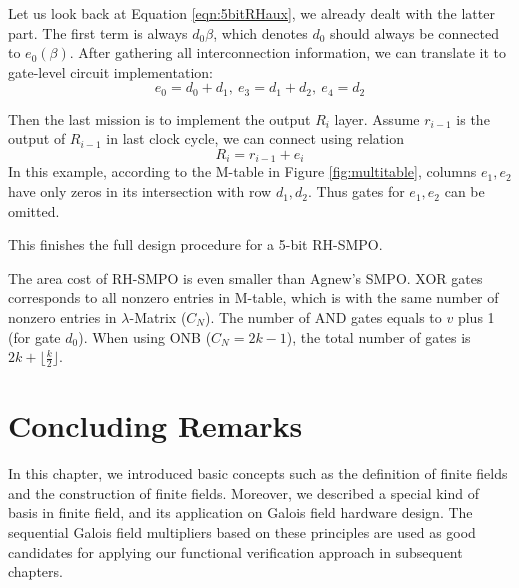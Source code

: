 \begin{Example}
Let us look back at Equation \ref{eqn:5bitRHaux}, we already dealt with the latter part.
The first term is always $d_0\beta$, which denotes $d_0$ should always be connected to $e_0(\beta)$.
After gathering all interconnection information, we can translate it to gate-level circuit implementation:
$$e_0 = d_0+d_1,~e_3=d_1+d_2,~e_4=d_2$$

Then the last mission is to implement the output $R_i$ layer. Assume $r_{i-1}$ is the output of 
$R_{i-1}$ in last clock cycle, we can connect using relation 
$$R_i = r_{i-1} + e_i$$
In this example, according to the M-table in Figure \ref{fig:multitable}, columns $e_1,e_2$
have only zeros in its intersection with row $d_1,d_2$. Thus gates for $e_1,e_2$ can be omitted.

This finishes the full design procedure for a 5-bit RH-SMPO.
\end{Example}

The area cost of RH-SMPO is even smaller than Agnew's SMPO. XOR gates corresponds to all nonzero entries 
in M-table, which is with the same number of nonzero entries in $\lambda$-Matrix ($C_N$). The number of AND gates 
equals to $v$ plus 1 (for gate $d_0$). When using ONB ($C_N = 2k-1$), the total number of gates 
is $2k+\lfloor \frac{k}{2}\rfloor$.

\section{Concluding Remarks}
In this chapter, we introduced basic concepts such as the definition of finite fields and the construction 
of finite fields. Moreover, we described a special kind of basis in finite field, and its 
application on Galois field hardware design. The sequential Galois field multipliers based on these 
principles are used as good candidates for applying our functional verification approach in subsequent chapters.